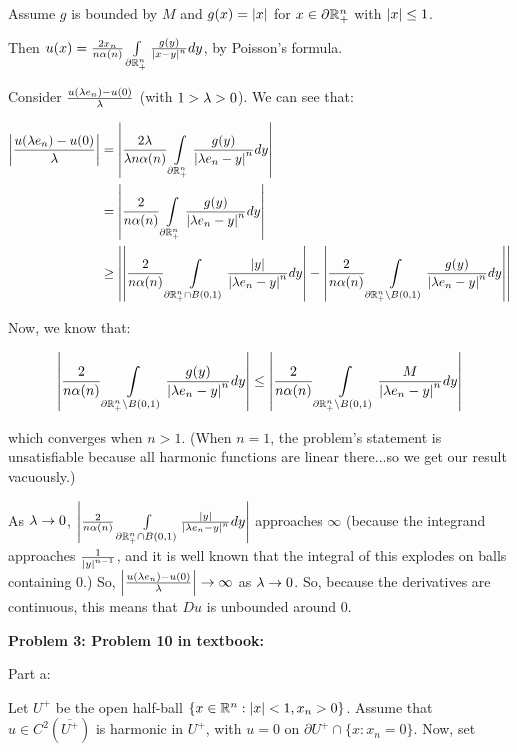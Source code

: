 \documentclass[a4paper,12pt]{article}
\begin{document}
Assume $g$ is bounded by $M$ and $g(x) = \left\lvert x \right\rvert$ for $x \in \partial \mathbb{R}_+^n$ with $\left\lvert x \right\rvert\leq 1$.

Then $u(x) = \frac{2x_n}{n\alpha(n)} \int\limits_{\partial \mathbb{R}^n_+} \frac{g(y)}{\left\lvert x-y \right\rvert^n} dy$, by Poisson's formula.

Consider $\frac{u(\lambda e_n) - u(0)}{\lambda}$ (with $1> \lambda >0$). We can see that:

\begin{align*}
\left\lvert \frac{u(\lambda e_n) - u(0)}{\lambda} \right\rvert &= \left\lvert  \frac{2\lambda}{\lambda n\alpha(n)} \int\limits_{\partial \mathbb{R}^n_+} \frac{g(y)}{\left\lvert \lambda e_n-y \right\rvert^n} dy \right\rvert\\
&= \left\lvert  \frac{2}{n\alpha(n)} \int\limits_{\partial \mathbb{R}^n_+} \frac{g(y)}{\left\lvert \lambda e_n-y \right\rvert^n} dy \right\rvert\\
&\geq \left\lvert \left\lvert  \frac{2}{n\alpha(n)} \int\limits_{\partial \mathbb{R}^n_+ \cap B(0,1)} \frac{\left\lvert y \right\rvert}{\left\lvert \lambda e_n-y \right\rvert^n} dy \right\rvert - \left\lvert  \frac{2}{n\alpha(n)} \int\limits_{\partial \mathbb{R}^n_+ \setminus B(0,1)} \frac{g(y)}{\left\lvert \lambda e_n-y \right\rvert^n} dy \right\rvert \right\rvert\\
\end{align*}

Now, we know that:

\begin{align*}
\left\lvert  \frac{2}{n\alpha(n)} \int\limits_{\partial \mathbb{R}^n_+ \setminus B(0,1)} \frac{g(y)}{\left\lvert \lambda e_n-y \right\rvert^n} dy \right\rvert &\leq \left\lvert  \frac{2}{n\alpha(n)} \int\limits_{\partial \mathbb{R}^n_+ \setminus B(0,1)} \frac{M}{\left\lvert \lambda e_n-y \right\rvert^n} dy \right\rvert\\
\end{align*} 

which converges when $n > 1$. (When $n = 1$, the problem's statement is unsatisfiable because all harmonic functions are linear there...so we get our result vacuously.)

As $\lambda \to 0$, $\left\lvert  \frac{2}{n\alpha(n)} \int\limits_{\partial \mathbb{R}^n_+ \cap B(0,1)} \frac{\left\lvert y \right\rvert}{\left\lvert \lambda e_n-y \right\rvert^n} dy \right\rvert$ approaches $\infty$ (because the integrand approaches $\frac{1}{\left\lvert y \right\rvert^{n-1}}$, and it is well known that the integral of this explodes on balls containing $0$.) So, $\left\lvert \frac{u(\lambda e_n) - u(0)}{\lambda} \right\rvert \to \infty$ as $\lambda \to 0$. So, because the derivatives are continuous, this means that $Du$ is unbounded around $0$. 

\shunt

{\bf Problem 3: Problem 10 in textbook:}

Part a:

Let $U^+$ be the open half-ball $\{ x \in \mathbb{R}^n : \left\lvert x \right\rvert < 1, x_n > 0\}$. Assume that $u \in C^2(\overline{U^+})$ is harmonic in $U^+$, with $u = 0$ on $\partial U^+ \cap \{x: x_n = 0\}$. Now, set
\end{document}
